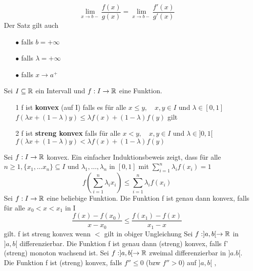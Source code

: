 \[ \lim\limits_{x \rightarrow b-} \frac{f(x)}{g(x)} = \lim\limits_{x \rightarrow b-} \frac{f'(x)}{g'(x)}\]
 Der Satz gilt auch 
\begin{enumerate}
    \item [$\bullet$] falls \(b = + \infty\)
    \item [$\bullet$] falls \( \lambda = + \infty\)
    \item [$\bullet$] falls \( x \rightarrow a^{+}\)
\end{enumerate}
 Sei \(I \subseteq \mathbb{R} \) ein Intervall und \(f: I \rightarrow \mathbb{R} \) eine Funktion.
\begin{enumerate}
    \item [1] f ist \textbf{konvex} (auf I) falls es für alle \(x \leq y, \quad x,y \in I \) und \(\lambda \in [0,1]\)
    \(f(\lambda x + (1 - \lambda)y) \leq \lambda f(x) + (1 - \lambda) f(y)\) gilt
    \item [2] f ist \textbf{streng konvex} falls für alle \(x < y, \quad x,y \in I \) und \( \lambda \in ]0,1[\)
    \(f(\lambda x + (1 - \lambda)y) < \lambda f(x) + (1 - \lambda)f(y)\)
\end{enumerate}
 Sei \(f : I \rightarrow \mathbb{R} \) konvex. Ein einfacher Induktionsbeweis zeigt, dass für alle \(n \geq 1, \{x_1, \dots x_n \} \subseteq I \) und \(\lambda_1, \dots, \lambda_n\) in \([0,1]\) mit \(\sum_{i=1}^n \lambda_i f(x_i) = 1\)
\[f(\sum_{i=1}^n \lambda_i x_i) \leq \sum_{i=1}^n \lambda_i f(x_i)\]
 Sei \(f : I \rightarrow \mathbb{R} \) eine beliebige Funktion. Die Funktion f ist genau dann konvex, falls für alle \(x_0 < x < x_1 \) in I
\[ \frac{f(x) - f(x_0)}{x - x_0} \leq \frac{f(x_1) - f(x)}{x_1 - x}\]
gilt. f ist streng konvex wenn \( < \) gilt in obiger Ungleichung
 Sei \(f : ]a,b[ \rightarrow \mathbb{R} \) in \(]a,b[\) differenzierbar. Die Funktion f ist genau dann (streng) konvex, falls f' (streng) monoton wachsend ist.
 Sei \(f : ]a,b[ \rightarrow \mathbb{R} \) zweimal differenzierbar in \(]a.b[\). Die Funktion f ist (streng) konvex, falls \(f'' \leq 0\) (bzw \(f'' > 0\)) auf \(]a,b[\)
\sep
